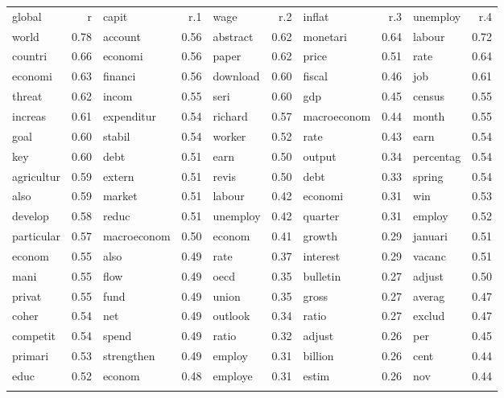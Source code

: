 \documentclass[11pt,article,oneside]{memoir}
\begin{document}
\begin{longtable}[c]{@{}lrlrlrlrlr@{}}
\toprule\addlinespace
global & r & capit & r.1 & wage & r.2 & inflat & r.3 & unemploy & r.4
\\\addlinespace
\midrule\endhead
world & 0.78 & account & 0.56 & abstract & 0.62 & monetari & 0.64 &
labour & 0.72
\\\addlinespace
countri & 0.66 & economi & 0.56 & paper & 0.62 & price & 0.51 & rate &
0.64
\\\addlinespace
economi & 0.63 & financi & 0.56 & download & 0.60 & fiscal & 0.46 & job
& 0.61
\\\addlinespace
threat & 0.62 & incom & 0.55 & seri & 0.60 & gdp & 0.45 & census & 0.55
\\\addlinespace
increas & 0.61 & expenditur & 0.54 & richard & 0.57 & macroeconom & 0.44
& month & 0.55
\\\addlinespace
goal & 0.60 & stabil & 0.54 & worker & 0.52 & rate & 0.43 & earn & 0.54
\\\addlinespace
key & 0.60 & debt & 0.51 & earn & 0.50 & output & 0.34 & percentag &
0.54
\\\addlinespace
agricultur & 0.59 & extern & 0.51 & revis & 0.50 & debt & 0.33 & spring
& 0.54
\\\addlinespace
also & 0.59 & market & 0.51 & labour & 0.42 & economi & 0.31 & win &
0.53
\\\addlinespace
develop & 0.58 & reduc & 0.51 & unemploy & 0.42 & quarter & 0.31 &
employ & 0.52
\\\addlinespace
particular & 0.57 & macroeconom & 0.50 & econom & 0.41 & growth & 0.29 &
januari & 0.51
\\\addlinespace
econom & 0.55 & also & 0.49 & rate & 0.37 & interest & 0.29 & vacanc &
0.51
\\\addlinespace
mani & 0.55 & flow & 0.49 & oecd & 0.35 & bulletin & 0.27 & adjust &
0.50
\\\addlinespace
privat & 0.55 & fund & 0.49 & union & 0.35 & gross & 0.27 & averag &
0.47
\\\addlinespace
coher & 0.54 & net & 0.49 & outlook & 0.34 & ratio & 0.27 & exclud &
0.47
\\\addlinespace
competit & 0.54 & spend & 0.49 & ratio & 0.32 & adjust & 0.26 & per &
0.45
\\\addlinespace
primari & 0.53 & strengthen & 0.49 & employ & 0.31 & billion & 0.26 &
cent & 0.44
\\\addlinespace
educ & 0.52 & econom & 0.48 & employe & 0.31 & estim & 0.26 & nov & 0.44
\\\addlinespace

\end{longtable}
\end{document}
